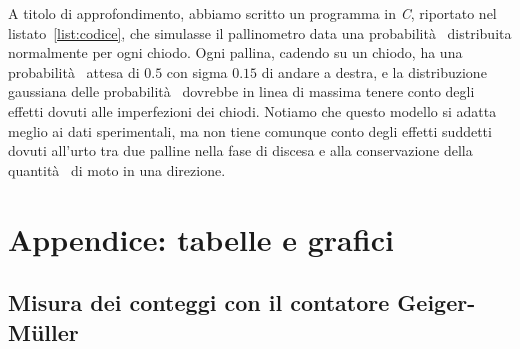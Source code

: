 \documentclass[10pt,oneside,a4paper]{article}
\begin{document}
A titolo di approfondimento, abbiamo scritto un programma in \emph{C}, riportato nel listato~\ref{list:codice}, che simulasse il pallinometro data una probabilità  distribuita normalmente per ogni chiodo. Ogni pallina, cadendo su un chiodo, ha una probabilità  attesa di $0.5$ con sigma $0.15$ di andare a destra, e la distribuzione gaussiana delle probabilità  dovrebbe in linea di massima tenere conto degli effetti dovuti alle imperfezioni dei chiodi. Notiamo che questo modello si adatta meglio ai dati sperimentali, ma non tiene comunque conto degli effetti suddetti dovuti all'urto tra due palline nella fase di discesa e alla conservazione della quantità  di moto in una direzione.




\pagebreak

\section{Appendice: tabelle e grafici}

\subsection{Misura dei conteggi con il contatore Geiger-M\"uller}
\end{document}
